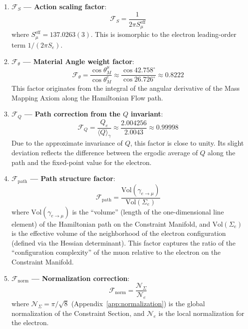 \documentclass[aps,prd,reprint,nofootinbib]{revtex4-2}
\begin{document}
\begin{enumerate}
\item \textbf{$\mathcal{F}_S$ --- Action scaling factor}:
  \begin{equation}
  \mathcal{F}_S = \frac{1}{2\pi S_\mu^{\text{eff}}} \label{eq:F_S}
  \end{equation}
  where $S_\mu^{\text{eff}} = 137.0263(3)$. This is isomorphic to the electron leading-order term $1/(2\pi S_e)$.

\item \textbf{$\mathcal{F}_\theta$ --- Material Angle weight factor}:
  \begin{equation}
  \mathcal{F}_\theta = \frac{\cos\theta_M^\mu}{\cos\theta_M^e} \approx \frac{\cos 42.758^\circ}{\cos 26.726^\circ} \approx 0.8222 \label{eq:F_theta}
  \end{equation}
  This factor originates from the integral of the angular derivative of the Mass Mapping Axiom along the Hamiltonian Flow path.

\item \textbf{$\mathcal{F}_Q$ --- Path correction from the $Q$ invariant}:
  \begin{equation}
  \mathcal{F}_Q = \frac{Q_e}{\langle Q \rangle_\gamma} \approx \frac{2.004256}{2.0043} \approx 0.99998 \label{eq:F_Q}
  \end{equation}
  Due to the approximate invariance of $Q$, this factor is close to unity. Its slight deviation reflects the difference between the ergodic average of $Q$ along the path and the fixed-point value for the electron.

\item \textbf{$\mathcal{F}_{\text{path}}$ --- Path structure factor}:
  \begin{equation}
  \mathcal{F}_{\text{path}} = \frac{\text{Vol}(\gamma_{e\to\mu})}{\text{Vol}(\Sigma_e)} \label{eq:F_path}
  \end{equation}
  where $\text{Vol}(\gamma_{e\to\mu})$ is the ``volume'' (length of the one-dimensional line element) of the Hamiltonian path on the Constraint Manifold, and $\text{Vol}(\Sigma_e)$ is the effective volume of the neighborhood of the electron configuration (defined via the Hessian determinant). This factor captures the ratio of the ``configuration complexity'' of the muon relative to the electron on the Constraint Manifold.

\item \textbf{$\mathcal{F}_{\text{norm}}$ --- Normalization correction}:
  \begin{equation}
  \mathcal{F}_{\text{norm}} = \frac{\mathcal{N}_\Sigma}{\mathcal{N}_e} \label{eq:F_norm}
  \end{equation}
  where $\mathcal{N}_\Sigma = \pi/\sqrt{8}$ (Appendix~\ref{app:normalization}) is the global normalization of the Constraint Section, and $\mathcal{N}_e$ is the local normalization for the electron.
\end{enumerate}
\end{document}
